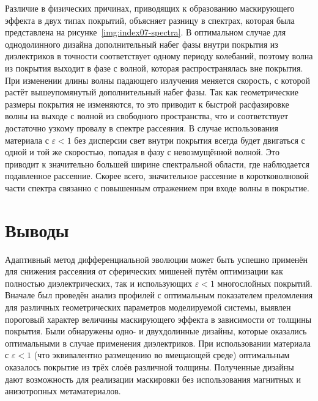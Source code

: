 Различие в физических причинах, приводящих к образованию маскирующего
эффекта в двух типах покрытий, объясняет разницу в спектрах, которая
была представлена на рисунке~\ref{img:index07-spectra}. В оптимальном
случае для однодолинного дизайна дополнительный набег фазы внутри
покрытия из диэлектриков в точности соответствует одному периоду
колебаний, поэтому волна из покрытия выходит в фазе с волной, которая
распространялась вне покрытия. При изменении длины волны падающего
излучения меняется скорость, с которой растёт вышеупомянутый
дополнительный набег фазы. Так как геометрические размеры покрытия не
изменяются, то это приводит к быстрой расфазировке волны на выходе с
волной из свободного пространства, что и соответствует достаточно
узкому провалу в спектре рассеяния. В случае использования материала с
${\varepsilon<1}$ без дисперсии свет внутри покрытия всегда будет
двигаться с одной и той же скоростью, попадая в фазу с невозмущённой
волной. Это приводит к значительно большей ширине спектральной
области, где наблюдается подавленное рассеяние. Скорее всего,
значительное рассеяние в коротковолновой части спектра связанно с
повышенным отражением при входе волны в покрытие.

\section{Выводы}


Адаптивный метод дифференциальной эволюции может быть успешно
применён для снижения рассеяния от сферических мишеней путём
оптимизации как полностью диэлектрических, так и использующих 
$\varepsilon < 1$ многослойных покрытий.  Вначале был проведён анализ
профилей с оптимальным показателем преломления для различных
геометрических параметров моделируемой системы, выявлен пороговый
характер величины маскирующего эффекта в зависимости от толщины
покрытия.  Были обнаружены одно- и двухдолинные дизайны, которые
оказались оптимальными в случае применения диэлектриков. При
использовании материала с $\varepsilon < 1$ (что эквивалентно
размещению во вмещающей среде) оптимальным оказалось покрытие из трёх
слоёв различной толщины. Полученные дизайны дают возможность для
реализации маскировки без использования магнитных и анизотропных
метаматериалов.



\clearpage